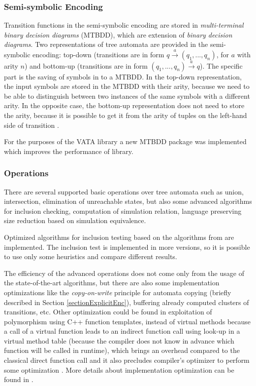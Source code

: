 \subsubsection{Semi-symbolic Encoding}
Transition functions in the semi-symbolic encoding are stored in \emph{multi-terminal binary decision diagrams} (MTBDD), 
which are extension of \emph{binary decision 
diagrams}. Two representations of tree automata are provided in the semi-symbolic encoding: 
top-down (transitions are in form $q \xrightarrow{a} (q_1,...,q_n)$, for $a$ with arity $n$) 
and bottom-up (transitions are in form $(q_1,...,q_n)\xrightarrow{a}q$). 
The specific part is the saving of symbols in to a MTBDD. In the top-down representation, the input
symbols are stored in the MTBDD with their arity, because we need to be able to distinguish between two instances of the same symbols with a different arity.
In the opposite case, the bottom-up representation does not need to store the arity, because it is possible to get it from the arity of tuples 
on the left-hand side of transition \cite{libvata}.

For the purposes of the VATA library a new MTBDD package was implemented which improves the performance of library.

\subsubsection{Operations}
There are several supported basic operations over tree automata 
such as union, intersection, elimination of unreachable states, but also some advanced algorithms for inclusion checking, 
computation of simulation relation, language preserving size reduction based on simulation equivalence. 

Optimized algorithms for inclusion testing based on the algorithms from \cite{cav06,tacas10} are implemented. 
The inclusion test is implemented in more versions, so it is possible
to use only some heuristics and compare different results.

The efficiency of the advanced operations does not come only from the usage of the state-of-the-art algorithms, 
but there are also some implementation optimizations like the \emph{copy-on-write}
principle for automata copying (briefly described in Section \ref{sectionExplicitEnc}), buffering already computed clusters of transitions, etc. 
Other optimization could be found in exploitation of polymorphism using C++ function templates, instead of
virtual methods because a call of a virtual function leads to an indirect function call using look-up in a virtual method table 
(because the compiler does not know in advance which function will be called in runtime), which brings an overhead compared to the classical direct 
function call and it also precludes compiler's optimizer to perform some optimization \cite{libvata}. 
More details about implementation optimization can be found in \cite{libvata}.

